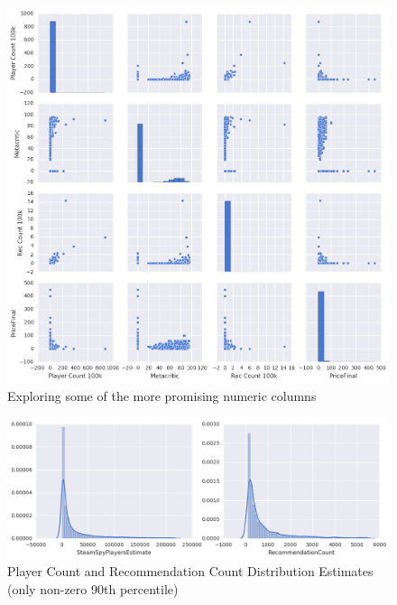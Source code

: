 \documentclass[letterpaper,10pt,twocolumn]{article}
\begin{document}
\begin{figure}[p]
    \caption{Exploring some of the more promising numeric columns \label{fig:numeric-explorations}}
    \includegraphics[width=\textwidth,keepaspectratio]{numeric-exploration}
\end{figure}

\begin{figure}[p]
    \caption{Player Count and Recommendation Count Distribution Estimates (only non-zero 90th percentile) \label{fig:players-recommendations-dists}}
    \includegraphics[width=\textwidth,keepaspectratio]{player-count-recommends-distribution}
\end{figure}
\end{document}
